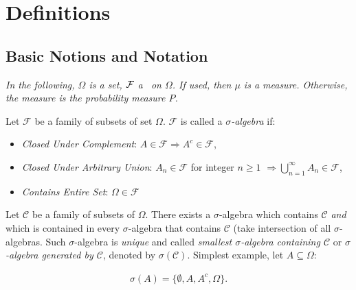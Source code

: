 
\section{Definitions}


\subsection{Basic Notions and Notation}

\textit{In the following, $\Omega$ is a set, $\mathcal{F}$ a \SigmaAlgebra\ on $\Omega$. If used, then $\mu$ is a measure. Otherwise, the measure is the probability measure $P$.}

\begin{definition}{1.1}{}

    Let $\mathcal{F}$ be a family of subsets of set $\Omega$. $\mathcal{F}$ is called a \emph{$\sigma$-algebra} if:

        \begin{itemize}
            \setlength{\parskip}{0em}
            \item \emph{Closed Under Complement}: $A \in \mathcal{F} \Rightarrow A^c \in \mathcal{F}$,
            \item \emph{Closed Under Arbitrary Union}: $A_n \in \mathcal{F}$ for integer $n \geq 1$ $\Rightarrow \bigcup_{n=1}^{\infty}A_n \in \mathcal{F}$,
            \item \emph{Contains Entire Set}: $\Omega \in \mathcal{F}$
        \end{itemize}

\end{definition}

\begin{definition}{1.2}{}
    Let $\mathcal{C}$ be a family of subsets of $\Omega$. There exists a $\sigma$-algebra which contains $\mathcal{C}$ \emph{and} which is contained in every $\sigma$-algebra that contains $\mathcal{C}$ (take intersection of all $\sigma$-algebras. Such $\sigma$-algebra is \emph{unique} and called \emph{smallest $\sigma$-algebra containing $\mathcal{C}$} or \emph{$\sigma$-algebra generated by $\mathcal{C}$}, denoted by $\sigma(\mathcal{C})$. Simplest example, let $A \subseteq \Omega$:

        \begin{align*}
            \sigma(A) = \{\emptyset, A, A^c, \Omega\}.
        \end{align*}
\end{definition}

